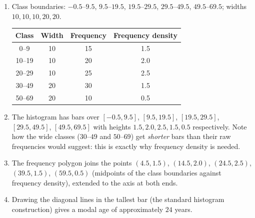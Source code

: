 \documentclass[11pt]{article}
\begin{document}
\begin{corrige}
\begin{enumerate}
\item Class boundaries: $-0.5$--$9.5$, $9.5$--$19.5$, $19.5$--$29.5$, $29.5$--$49.5$, $49.5$--$69.5$; widths $10, 10, 10, 20, 20$.
\begin{center}
\begin{tabular}{|c|c|c|c|}\hline
\rowcolor{popblueL} Class & Width & Frequency & Frequency density \\ \hline
0--9 & 10 & 15 & 1.5 \\ \hline
10--19 & 10 & 20 & 2.0 \\ \hline
20--29 & 10 & 25 & 2.5 \\ \hline
30--49 & 20 & 30 & 1.5 \\ \hline
50--69 & 20 & 10 & 0.5 \\ \hline
\end{tabular}
\end{center}
\item The histogram has bars over $[-0.5, 9.5]$, $[9.5, 19.5]$, $[19.5, 29.5]$, $[29.5, 49.5]$, $[49.5, 69.5]$ with heights $1.5, 2.0, 2.5, 1.5, 0.5$ respectively. Note how the wide classes ($30$--$49$ and $50$--$69$) get \emph{shorter} bars than their raw frequencies would suggest: this is exactly why frequency density is needed.
\item The frequency polygon joins the points $(4.5, 1.5)$, $(14.5, 2.0)$, $(24.5, 2.5)$, $(39.5, 1.5)$, $(59.5, 0.5)$ (midpoints of the class boundaries against frequency density), extended to the axis at both ends.
\item Drawing the diagonal lines in the tallest bar (the standard histogram construction) gives a modal age of approximately $24$ years.
\end{enumerate}
\end{corrige}
\end{document}
